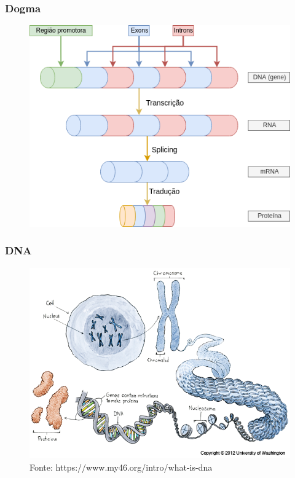 \documentclass{beamer}
\begin{document}
		\begin{frame} \frametitle{Dogma}
		\begin{figure}[hbtp]
			\centering
			\includegraphics[scale=0.5]{img/dogma_tt.png}
		\end{figure}
		\end{frame}
		
		\begin{frame} \frametitle{DNA}
		\begin{figure}[hbtp]
			\centering
			\includegraphics[scale=0.42]{img/dna01.png}
			\caption{\tiny{Fonte: https://www.my46.org/intro/what-is-dna}}
		\end{figure}
		\end{frame}	
	
\end{document}
